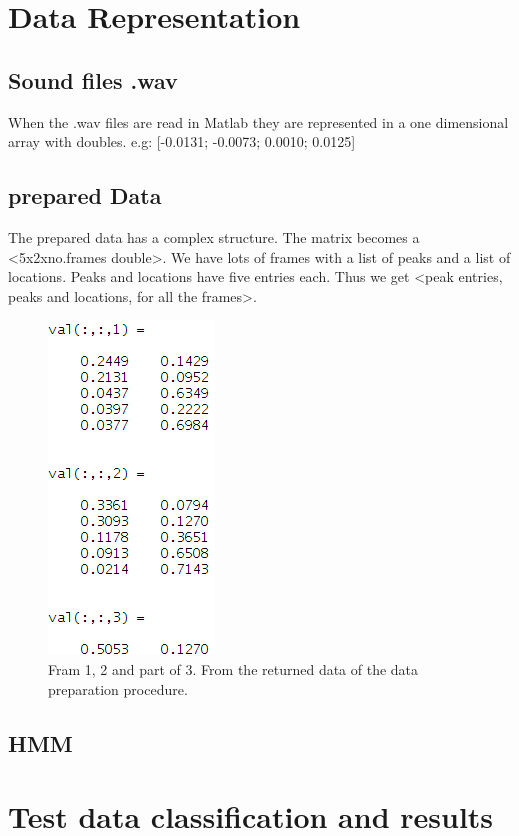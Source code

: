 \documentclass[titlepage]{article}
\begin{document}
\section{Data Representation}
    \subsection{Sound files .wav} 
When the .wav files are read in Matlab they are represented in a one dimensional array with doubles. e.g: [-0.0131; -0.0073; 0.0010; 0.0125]
    \subsection{prepared Data}
The prepared data has a complex structure. The matrix becomes a <5x2xno.frames double>. We have lots of frames with a list of peaks and a list of locations. Peaks and locations have five entries each. Thus we get <peak entries, peaks and locations, for all the frames>.
\begin{figure}[]
  \centering
    \includegraphics[height=60mm\textwidth]{data_part1}
  \caption{Fram 1, 2 and part of 3. From the returned data of the data preparation procedure.}
\end{figure}

    \subsection{HMM}

  
\section{Test data classification and results}
\end{document}
